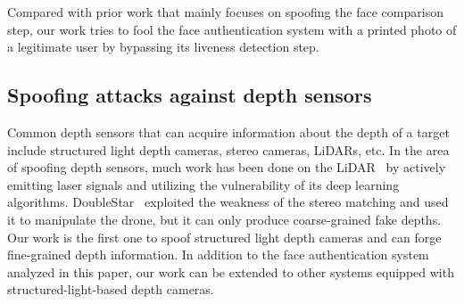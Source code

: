 Compared with prior work that mainly focuses on spoofing the face comparison step, our work tries to fool the face authentication system with a printed photo of a legitimate user by bypassing its liveness detection step.


\subsection{Spoofing attacks against depth sensors} 
Common depth sensors that can acquire information about the depth of a target include structured light depth cameras,  stereo cameras, LiDARs, etc.
In the area of spoofing depth sensors, much work has been done on the LiDAR~\cite{cao2019adversarial, sun2020towards, tu2020physically} by actively emitting laser signals and utilizing the vulnerability of its deep learning algorithms.
DoubleStar~\cite{277102} exploited the weakness of the stereo matching and used it to manipulate the drone, but it can only produce coarse-grained fake depths. 
Our work is the first one to spoof structured light depth cameras and can forge fine-grained depth information. In addition to the face authentication system analyzed in this paper, our work can be extended to other systems equipped with structured-light-based depth cameras.